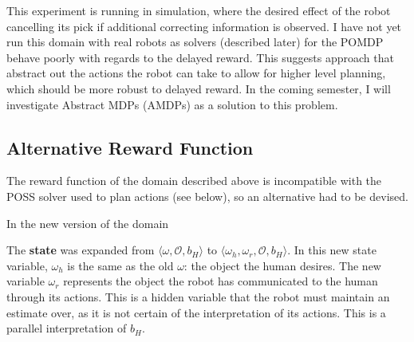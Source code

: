 \documentclass{article}
\begin{document}
This experiment is running in simulation, where the desired effect of the robot cancelling its pick if additional correcting information is observed. I have not yet run this domain with real robots as solvers (described later) for the POMDP behave poorly with regards to the delayed reward. This suggests approach that abstract out the actions the robot can take to allow for higher level planning, which should be more robust to delayed reward. In the coming semester, I will investigate Abstract MDPs (AMDPs) as a solution to this problem. 

\subsection{Alternative Reward Function}

The reward function of the domain described above is incompatible with the POSS solver used to plan actions (see below), so an alternative had to be devised. 

In the new version of the domain

The \textbf{state} was expanded from $\langle \omega, \mathcal{O}, b_H \rangle$ to $\langle \omega_h, \omega_r, \mathcal{O}, b_H \rangle$. In this new state variable, $\omega_h$ is the same as the old $\omega$: the object the human desires. The new variable $\omega_r$ represents the object the robot has communicated to the human through its actions. This is a hidden variable that the robot must maintain an estimate over, as it is not certain of the interpretation of its actions. This is a parallel interpretation of $b_H$. 
\end{document}
